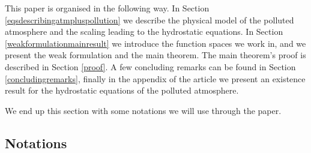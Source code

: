 \documentclass[11pt]{article}
\begin{document}
This paper is organised in the following way. In Section \ref{eqsdescribingatmpluspollution} we describe the physical model of the polluted atmosphere and the scaling leading to the hydrostatic equations. In Section \ref{weakformulationmainresult} we introduce the function spaces we work in, and we present the weak formulation and the main theorem. The main theorem's proof is described in Section \ref{proof}. A few concluding remarks can be found in Section \ref{concludingremarks}, finally in the appendix of the article we present an existence result for the hydrostatic equations of the polluted atmosphere.

We end up this section with some notations we will use through the paper.

\subsection{Notations}
\end{document}

